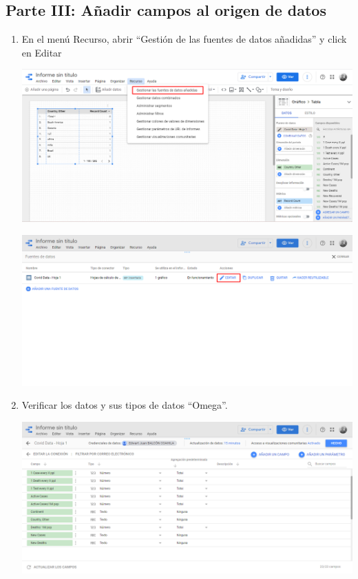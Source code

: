 \documentclass{article}
\begin{document}
    \subsection{Parte III: Añadir campos al origen de datos}
    \begin{enumerate}[\tab 1.]
        \item En el menú Recurso, abrir “Gestión de las fuentes de datos añadidas” y click en Editar
        \begin{center}
            \includegraphics[width=13cm]{./images/10.png}
        \end{center}
        \begin{center}
            \includegraphics[width=13cm]{./images/11.png}
        \end{center}
        \newpage
        \item Verificar los datos y sus tipos de datos “Omega”.
        \begin{center}
            \includegraphics[width=13cm]{./images/12.png}

\end{center}
\end{enumerate}
\end{document}
